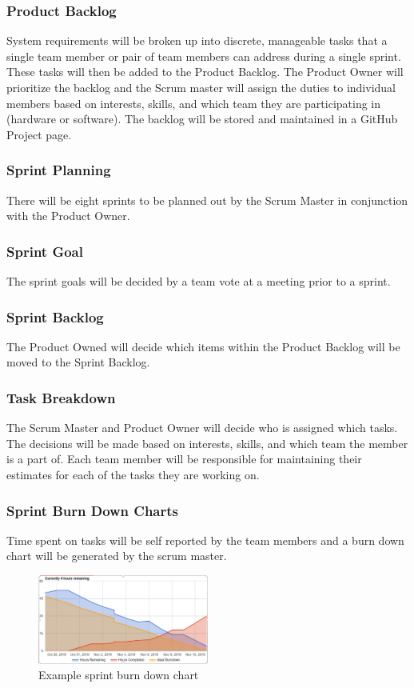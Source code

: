 \subsubsection{Product Backlog}
System requirements will be broken up into discrete, manageable tasks that a single team member or pair of team members can address during a single sprint. These tasks will then be added to the Product Backlog. The Product Owner will prioritize the backlog and the Scrum master will assign the duties to individual members based on interests, skills, and which team they are participating in (hardware or software). The backlog will be stored and maintained in a GitHub Project page.

\subsubsection{Sprint Planning}
There will be eight sprints to be planned out by the Scrum Master in conjunction with the Product Owner.

\subsubsection{Sprint Goal}
The sprint goals will be decided by a team vote at a meeting prior to a sprint.

\subsubsection{Sprint Backlog}
The Product Owned will decide which items within the Product Backlog will be moved to the Sprint Backlog.

\subsubsection{Task Breakdown}
The Scrum Master and Product Owner will decide who is assigned which tasks. The decisions will be made based on interests, skills, and which team the member is a part of. Each team member will be responsible for maintaining their estimates for each of the tasks they are working on.

\subsubsection{Sprint Burn Down Charts}
Time spent on tasks will be self reported by the team members and a burn down chart will be generated by the scrum master.

\begin{figure}[h!]
    \centering
    \includegraphics[width=0.5\textwidth]{images/temp0.PNG}
    \caption{Example sprint burn down chart}
\end{figure}

